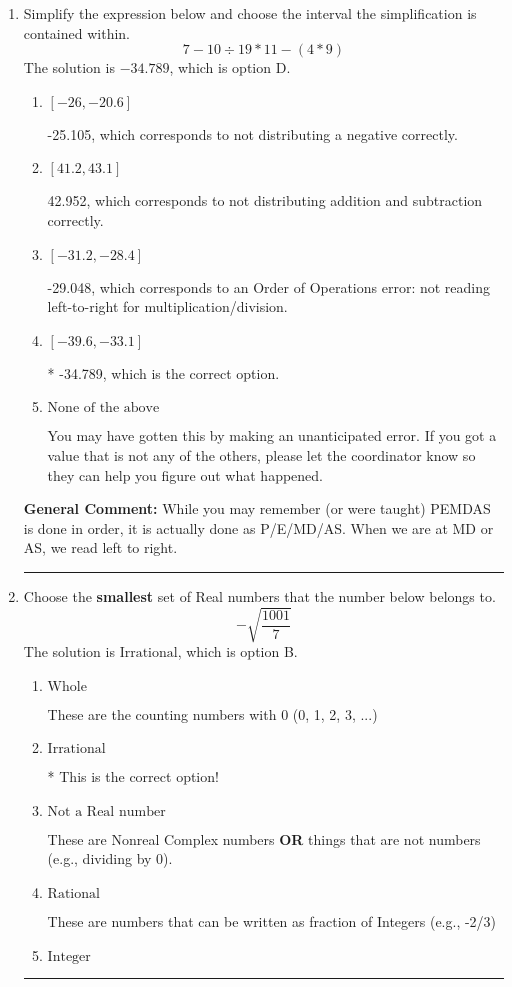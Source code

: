 \documentclass{extbook}[14pt]
\newcommand{\litem}[1]{\item #1

\rule{\textwidth}{0.4pt}}
\begin{document}
\begin{enumerate}
{ Irrational numbers are more than just square root of 3: adding or subtracting values from square root of 3 is also irrational.
}
\litem{
Simplify the expression below and choose the interval the simplification is contained within.
\[ 7 - 10 \div 19 * 11 - (4 * 9) \]
The solution is \( -34.789 \), which is option D.\begin{enumerate}[label=\Alph*.]
\item \( [-26, -20.6] \)

 -25.105, which corresponds to not distributing a negative correctly.
\item \( [41.2, 43.1] \)

 42.952, which corresponds to not distributing addition and subtraction correctly.
\item \( [-31.2, -28.4] \)

 -29.048, which corresponds to an Order of Operations error: not reading left-to-right for multiplication/division.
\item \( [-39.6, -33.1] \)

* -34.789, which is the correct option.
\item \( \text{None of the above} \)

 You may have gotten this by making an unanticipated error. If you got a value that is not any of the others, please let the coordinator know so they can help you figure out what happened.
\end{enumerate}

\textbf{General Comment:} While you may remember (or were taught) PEMDAS is done in order, it is actually done as P/E/MD/AS. When we are at MD or AS, we read left to right.
}
\litem{
Choose the \textbf{smallest} set of Real numbers that the number below belongs to.
\[ -\sqrt{\frac{1001}{7}} \]
The solution is \( \text{Irrational} \), which is option B.\begin{enumerate}[label=\Alph*.]
\item \( \text{Whole} \)

These are the counting numbers with 0 (0, 1, 2, 3, ...)
\item \( \text{Irrational} \)

* This is the correct option!
\item \( \text{Not a Real number} \)

These are Nonreal Complex numbers \textbf{OR} things that are not numbers (e.g., dividing by 0).
\item \( \text{Rational} \)

These are numbers that can be written as fraction of Integers (e.g., -2/3)
\item \( \text{Integer} \)


\end{enumerate}}
\end{enumerate}
\end{document}

